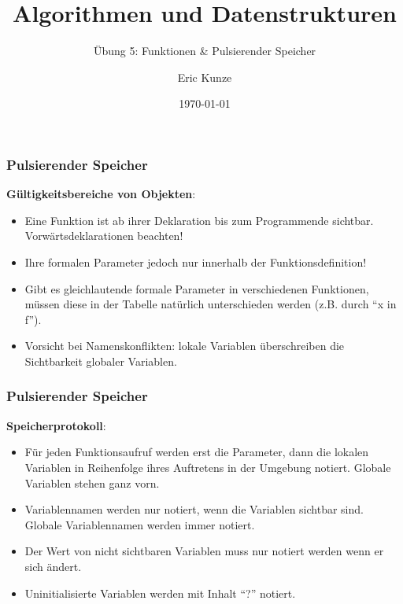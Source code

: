 \documentclass{beamer}
\begin{document}
	
	\title{Algorithmen und Datenstrukturen}
	\subtitle{Übung 5: Funktionen \& Pulsierender Speicher}
	\author{Eric Kunze}
	\date{\today}

	\maketitle




\begin{frame} \frametitle{Pulsierender Speicher}
	\small
	\textbf{Gültigkeitsbereiche von Objekten}:
	\begin{itemize}
		\item Eine Funktion ist ab ihrer Deklaration bis zum Programmende sichtbar. Vorwärtsdeklarationen beachten!
		\item  Ihre formalen Parameter jedoch nur innerhalb der Funktionsdefinition!
		\item Gibt es gleichlautende formale Parameter in verschiedenen Funktionen, müssen diese in der Tabelle natürlich unterschieden werden (z.B. durch \enquote{x in f}).
		\item Vorsicht bei Namenskonflikten: lokale Variablen überschreiben die Sichtbarkeit globaler Variablen.
	\end{itemize}
\end{frame}

\begin{frame} \frametitle{Pulsierender Speicher}
	\small
	\textbf{Speicherprotokoll}:
	\begin{itemize}
		\item Für jeden Funktionsaufruf werden erst die Parameter, dann die lokalen Variablen in Reihenfolge ihres Auftretens in der Umgebung notiert. Globale Variablen stehen ganz vorn.
		\item Variablennamen werden nur notiert, wenn die Variablen sichtbar sind. Globale Variablennamen werden immer notiert.
		\item Der Wert von nicht sichtbaren Variablen muss nur notiert werden wenn er sich ändert.
		\item Uninitialisierte Variablen werden mit Inhalt \enquote{?} notiert.
	\end{itemize}
\end{frame}
\end{document}
